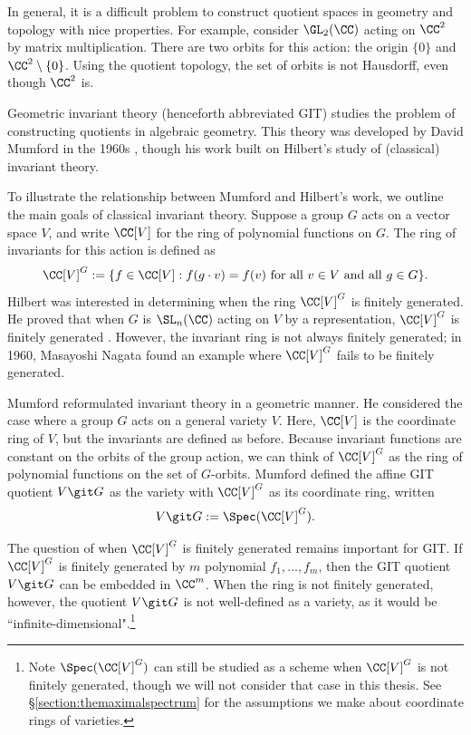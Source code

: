 \documentclass[12pt]{amsart}
\theoremstyle{plain}
\begin{document}
In general, it is a difficult problem to construct quotient spaces in geometry and topology with nice properties.
For example, consider $\GL_2(\CC)$ acting on $\CC^2$ by matrix multiplication.
There are two orbits for this action: the origin $\{0\}$ and $\CC^2\setminus\{0\}$.
Using the quotient topology, the set of orbits is not Hausdorff, even though $\CC^2$ is.

Geometric invariant theory (henceforth abbreviated GIT) studies the problem of constructing quotients in algebraic geometry.
This theory was developed by David Mumford in the 1960s \cite{Mumford65}, though his work built on Hilbert's study of (classical) invariant theory.

To illustrate the relationship between Mumford and Hilbert's work, we outline the main goals of classical invariant theory.
Suppose a group $G$ acts on a vector space $V$, and write $\CC[V]$ for the ring of polynomial functions on $G$.
The ring of invariants for this action is defined as
$$\CC[V]^G := \{f \in \CC[V] : f(g \cdot v) = f(v) \text{ for all } v \in V \text{ and all } g \in G\}.$$
Hilbert was interested in determining when the ring $\CC[V]^G$ is finitely generated.
He proved that when $G$ is $\SL_n(\CC)$ acting on $V$ by a representation, $\CC[V]^G$ is finitely generated \cite{Hilbert90}.
However, the invariant ring is not always finitely generated; in 1960, Masayoshi Nagata found an example where $\CC[V]^G$ fails to be finitely generated.

Mumford reformulated invariant theory in a geometric manner.
He considered the case where a group $G$ acts on a general variety $V$.
Here, $\CC[V]$ is the coordinate ring of $V$, but the invariants are defined as before.
Because invariant functions are constant on the orbits of the group action, we can think of $\CC[V]^G$ as the ring of polynomial functions on the set of $G$-orbits.
Mumford defined the affine GIT quotient $V \git G$ as the variety with $\CC[V]^G$ as its coordinate ring, written
$$V \git G := \Spec(\CC[V]^G).$$

The question of when $\CC[V]^G$ is finitely generated remains important for GIT.
If $\CC[V]^G$ is finitely generated by $m$ polynomial $f_1, \ldots, f_m$, then the GIT quotient $V \git G$ can be embedded in $\CC^m$.
When the ring is not finitely generated, however, the quotient $V \git G$ is not well-defined as a variety, as it would be ``infinite-dimensional".\footnote{Note $\Spec(\CC[V]^G)$ can still be studied as a scheme when $\CC[V]^G$ is not finitely generated, though we will not consider that case in this thesis. See \S \ref{section:themaximalspectrum} for the assumptions we make about coordinate rings of varieties.}
\end{document}
